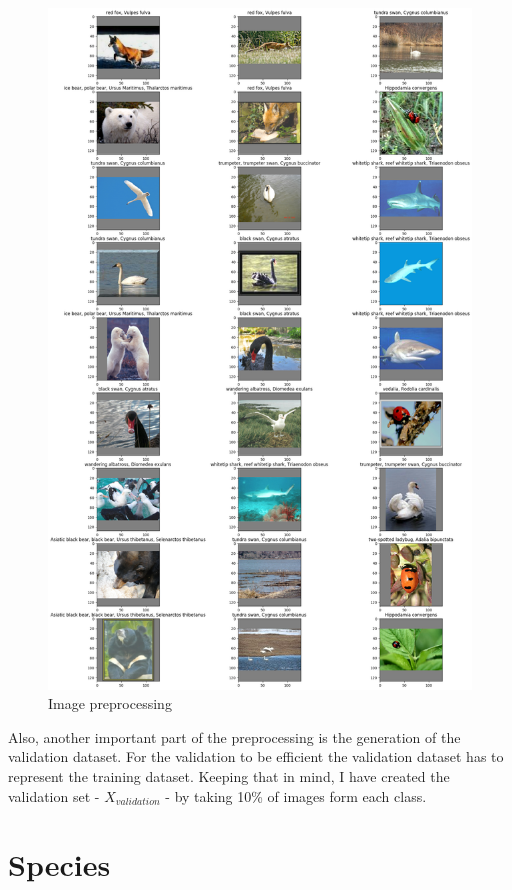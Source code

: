 \documentclass[times, utf8, diplomski]{fer}
\begin{document}
 
\begin{figure}
  \includegraphics[scale=0.36]{figures/preprocessing_images.png}
  \centering
  \caption{Image preprocessing}
  \label{fig:preprocessing_images}
\end{figure}

Also, another important part of the preprocessing is the generation of the validation dataset. For the validation to be efficient the validation dataset has to represent the training dataset. Keeping that in mind, I have created the validation set - $X_{validation}$ - by taking 10\% of images form each class.


\section{Species}
\label{se:species}
\end{document}
